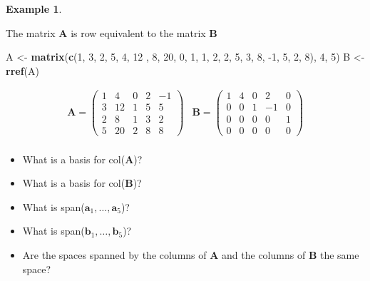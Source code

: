\documentclass[
]{book}
\newenvironment{Shaded}{\begin{snugshade}}{\end{snugshade}}
\newcommand{\DecValTok}[1]{\textcolor[rgb]{0.00,0.00,0.81}{#1}}
\newcommand{\KeywordTok}[1]{\textcolor[rgb]{0.13,0.29,0.53}{\textbf{#1}}}
\newcommand{\NormalTok}[1]{#1}
\newcommand{\StringTok}[1]{\textcolor[rgb]{0.31,0.60,0.02}{#1}}
\theoremstyle{definition}
\theoremstyle{definition}
\newtheorem{example}{Example}[chapter]
\theoremstyle{definition}
\theoremstyle{remark}
\begin{document}
\begin{example}
\protect\hypertarget{exm:unlabeled-div-133}{}\label{exm:unlabeled-div-133}

The matrix \(\mathbf{A}\) is row equivalent to the matrix \(\mathbf{B}\)

\begin{Shaded}
\begin{Highlighting}[]
\NormalTok{A <-}\StringTok{ }\KeywordTok{matrix}\NormalTok{(}\KeywordTok{c}\NormalTok{(}\DecValTok{1}\NormalTok{, }\DecValTok{3}\NormalTok{, }\DecValTok{2}\NormalTok{, }\DecValTok{5}\NormalTok{, }\DecValTok{4}\NormalTok{, }\DecValTok{12}\NormalTok{ , }\DecValTok{8}\NormalTok{, }\DecValTok{20}\NormalTok{, }\DecValTok{0}\NormalTok{, }\DecValTok{1}\NormalTok{, }\DecValTok{1}\NormalTok{, }\DecValTok{2}\NormalTok{, }\DecValTok{2}\NormalTok{, }\DecValTok{5}\NormalTok{, }\DecValTok{3}\NormalTok{, }\DecValTok{8}\NormalTok{, }\DecValTok{-1}\NormalTok{, }\DecValTok{5}\NormalTok{, }\DecValTok{2}\NormalTok{, }\DecValTok{8}\NormalTok{), }\DecValTok{4}\NormalTok{, }\DecValTok{5}\NormalTok{)}
\NormalTok{B <-}\StringTok{ }\KeywordTok{rref}\NormalTok{(A)}
\end{Highlighting}
\end{Shaded}

\[
\begin{aligned}
\mathbf{A} = \begin{pmatrix} 1 & 4 & 0 & 2 & -1 \\ 3 & 12 & 1 & 5 & 5 \\ 2 & 8 & 1 & 3 & 2 \\ 5 & 20 & 2 & 8 & 8 \end{pmatrix} & \mathbf{B} = \begin{pmatrix} 1 & 4 & 0 & 2 & 0 \\ 0 & 0 & 1 & -1 & 0 \\ 0 & 0 & 0 & 0 & 1 \\ 0 & 0 & 0 & 0 & 0 \end{pmatrix} \\
\end{aligned}
\]

\begin{itemize}
\item
  What is a basis for col(\(\mathbf{A}\))?
\item
  What is a basis for col(\(\mathbf{B}\))?
\item
  What is span(\(\mathbf{a}_1, \ldots, \mathbf{a}_5\))?
\item
  What is span(\(\mathbf{b}_1, \ldots, \mathbf{b}_5\))?
\item
  Are the spaces spanned by the columns of \(\mathbf{A}\) and the columns of \(\mathbf{B}\) the same space?
\end{itemize}

\end{example}
\end{document}

